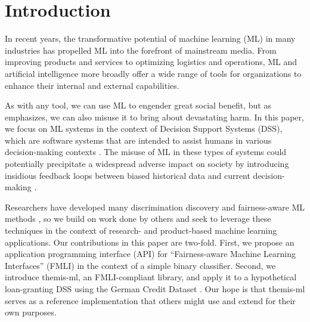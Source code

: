 \documentclass{acm_proc_article-sp}
\begin{document}




\section{Introduction} In recent years, the transformative potential of machine
learning (ML) in many industries has propelled ML into the forefront of
mainstream media. From improving products and services to optimizing logistics
and operations, ML and artificial intelligence more broadly offer a wide range
of tools for organizations to enhance their internal and external capabilities.

As with any tool, we can use ML to engender great social benefit, but as
\cite{o2017weapons} emphasizes, we can also misuse it to bring about devastating
harm. In this paper, we focus on ML systems in the context of Decision Support
Systems (DSS), which are software systems that are intended to assist humans in
various decision-making contexts \cite{yoshimura2006decision,
montgomery2000evaluation, barnett1987dxplain, mysiak2005towards}. The misuse of
ML in these types of systems could potentially precipitate a widespread adverse
impact on society by introducing insidious feedback loops between biased
historical data and current decision- making \cite{o2017weapons}.

Researchers have developed many discrimination discovery and fairness-aware ML
methods \cite{kusner2017counterfactual, kamiran2012data, kamishima2012fairness,
kamiran2012decision, zemel2013learning, zafar2017fairness, dwork2012fairness,
zliobaite2015survey}, so we build on work done by others and seek to leverage
these techniques in the context of research- and product-based machine learning
applications. Our contributions in this paper are two-fold. First, we propose an
application programming interface (API) for ``Fairness-aware Machine Learning
Interfaces'' (FMLI) in the context of a simple binary classifier. Second, we
introduce themis-ml, an FMLI-compliant library, and apply it to a hypothetical
loan-granting DSS using the German Credit Dataset \cite{bache2013uci}. Our hope
is that themis-ml serves as a reference implementation that others might use and
extend for their own purposes.
\end{document}
